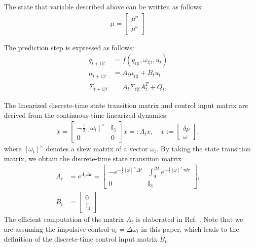 \documentclass[conference]{IEEEtran}
\begin{document}
The state that variable described above can be written as follows:
\begin{align*}
    \mu = \begin{bmatrix}
        \mu^p \\
        \mu^{\omega}
    \end{bmatrix}
\end{align*}
    
The prediction step is expressed as follows:
%
\begin{align*}
    q_{t+1|t} & = f(q_{t|t}, \omega_{t|t}, u_t) \\
    \mu_{t+1|t}
     & = A_{t} 
    \mu_{t|t} + B_t u_t  \\
    \Sigma_{t+1|t} & = A_t \Sigma_{t|t} A_t^T + Q_t,
\end{align*}

The linearized discrete-time state transition matrix and control input matrix are derived from the continuous-time linearized dynamics: 
%
\begin{align}
    \dot{x} = 
    \begin{bmatrix}
        -\frac{1}{2} [\omega_t]^{\times} & \mathbb{I}_3 \\
        0 & 0 
    \end{bmatrix} x =: \Lambda_t x, 
    \quad 
    x :=  \begin{bmatrix}
        \delta p \\ \omega
    \end{bmatrix},
\end{align}
%
where $[\omega_t]^{\times}$ denotes a skew matrix of a vector $\omega_t$.
By taking the state transition matrix, we obtain the discrete-time state transition matrix 
%
\begin{align}
    A_t & = e^{\Lambda_t \Delta t} = \begin{bmatrix}
        -e ^{-\frac{1}{2}[\omega]^{\times}\Delta t} & 
        \int_{0}^{\Delta t} e^{-\frac{1}{2}[\omega]^{\times} \tau d\tau } \\
        0 & \mathbb{I}_3
    \end{bmatrix}, \\
    B_t & = \begin{bmatrix}
        0 \\ \mathbb{I}_3
    \end{bmatrix}
\end{align}
%
The efficient computation of the matrix $A_t$ is elaborated in Ref. . 
Note that we are assuming the impulsive control $u_t = \Delta \omega_t$ in this paper, which leads to the definition of the discrete-time control input matrix $B_t$.
\end{document}
